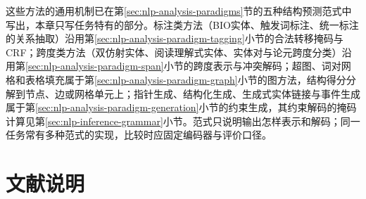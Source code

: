 这些方法的通用机制已在第\ref{sec:nlp-analysis-paradigms}节的五种结构预测范式中写出，本章只写任务特有的部分。标注类方法（BIO实体、触发词标注、统一标注的关系抽取）沿用第\ref{sec:nlp-analysis-paradigm-tagging}小节的合法转移掩码与CRF；跨度类方法（双仿射实体、阅读理解式实体、实体对与论元跨度分类）沿用第\ref{sec:nlp-analysis-paradigm-span}小节的跨度表示与冲突解码；超图、词对网格和表格填充属于第\ref{sec:nlp-analysis-paradigm-graph}小节的图方法，结构得分分解到节点、边或网格单元上；指针生成、结构化生成、生成式实体链接与事件生成属于第\ref{sec:nlp-analysis-paradigm-generation}小节的约束生成，其约束解码的掩码计算见第\ref{sec:nlp-inference-grammar}小节。范式只说明输出怎样表示和解码；同一任务常有多种范式的实现，比较时应固定编码器与评价口径。







\section*{文献说明}

